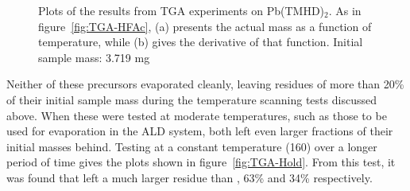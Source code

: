 \begin{figure}[tbp]
   \centering
	\hspace{1cm}
   \caption[TGA Results for Pb(HFAc)$_{2}$ Precursor]%
   		{Plots of the results from TGA experiments on Pb(TMHD)$_{2}$. As in figure~\vref{fig:TGA-HFAc}, (a) %
		presents the actual mass as a function of temperature, while (b) gives the derivative of that function. %
		Initial sample mass: 3.719 mg}
   \label{fig:TGA-TMHD}
\end{figure}

Neither of these precursors evaporated cleanly, leaving residues of more than 20\% of their initial sample mass during the temperature scanning tests discussed above. When these were tested at moderate temperatures, such as those to be used for evaporation in the ALD system, both left even larger fractions of their initial masses behind. Testing at a constant temperature (160\degC{}) over a longer period of time gives the plots shown in figure~\vref{fig:TGA-Hold}. From this test, it was found that \HFAc{} left a much larger residue than \TMHD{}, 63\% and 34\% respectively. 

